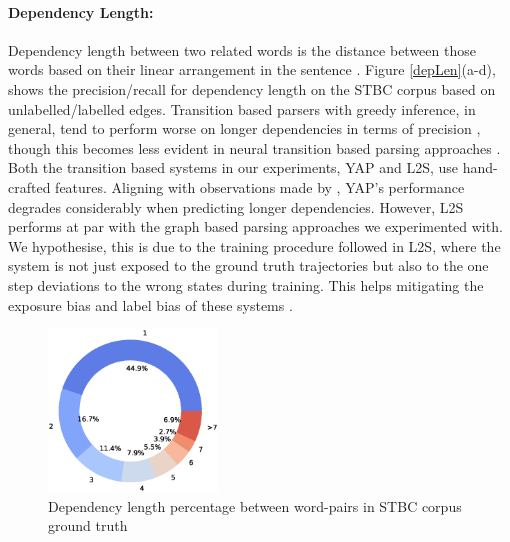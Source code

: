 \documentclass[11pt]{article}
\begin{document}
\paragraph{Dependency Length:} Dependency length between two related words is the  distance between those words  based on their linear arrangement in the sentence \cite{mcdonald-nivre-2007-characterizing}. 
Figure \ref{depLen}(a-d), shows the precision/recall for dependency length on the STBC corpus based on  unlabelled/labelled edges. Transition based parsers with greedy inference, in general, tend to perform worse on  longer dependencies in terms of precision \cite{mcdonald-nivre-2007-characterizing,mcdonald-nivre-2011-analyzing}, though this becomes less evident in neural transition based parsing approaches \cite{kulmizev-etal-2019-deep}. 
Both the transition based systems in our experiments, YAP and L2S, use hand-crafted features. Aligning with observations made by , YAP's performance degrades considerably when predicting longer dependencies. However, L2S performs at par with the graph based parsing approaches we experimented with. We hypothesise, this is due to the training procedure followed in L2S, where the system is not just  exposed to the ground truth trajectories but also to the one step deviations to the wrong states during training. This helps mitigating the exposure bias and label bias of these systems \cite{wiseman-rush-2016-sequence}.

\begin{figure}
\includegraphics[width=0.4\textwidth]{images/depLen.eps}
\caption{Dependency length percentage between word-pairs in STBC corpus ground truth}
\label{depLenRecall}
\end{figure}
\end{document}
